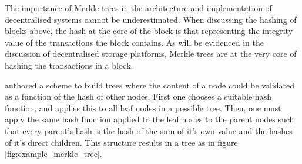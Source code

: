 The importance of Merkle trees in the architecture and implementation of decentralised systems cannot be underestimated. When discussing the hashing of blocks above, the hash at the core of the block is that representing the integrity value of the transactions the block contains. As will be evidenced in the discussion of decentralised storage platforms, Merkle trees are at the very core of hashing the transactions in a block.

\cite{merkle:1988:inbook} authored a scheme to build trees where the content of a node could be validated as a function of the hash of other nodes. First one chooses a suitable hash function, and applies this to all leaf nodes in a possible tree. Then, one must apply the same hash function applied to the leaf nodes to the parent nodes such that every parent's hash is the hash of the sum of it's own value and the hashes of it's direct children. This structure results in a tree as in figure \ref{fig:example_merkle_tree}.


